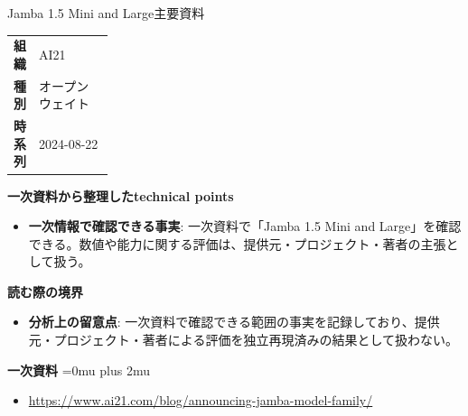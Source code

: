 \begin{technicalnote}{Jamba 1.5 Mini and Large}{主要資料}
\begingroup
\begin{tabularx}{\linewidth}{@{}>{\bfseries}p{0.22\linewidth}X@{}}
組織 & AI21 \\
種別 & オープンウェイト \\
時系列 & 2024-08-22 \\
\end{tabularx}
\smallskip
{\bfseries 一次資料から整理したtechnical points}
\begin{itemize}[leftmargin=1.5em,itemsep=0.35em]
\item \textbf{一次情報で確認できる事実}: 一次資料で「Jamba 1.5 Mini and Large」を確認できる。数値や能力に関する評価は、提供元・プロジェクト・著者の主張として扱う。
\end{itemize}
\begin{minipage}{\linewidth}
{\bfseries 読む際の境界}
\begin{itemize}[leftmargin=1.5em,itemsep=0.35em]
\item \textbf{分析上の留意点}: 一次資料で確認できる範囲の事実を記録しており、提供元・プロジェクト・著者による評価を独立再現済みの結果として扱わない。
\end{itemize}
\begin{samepage}
{\bfseries 一次資料}
\begingroup\sloppy
\Urlmuskip=0mu plus 2mu\relax
\begin{itemize}[leftmargin=1.5em,itemsep=0.25em]
\item {\scriptsize\url{https://www.ai21.com/blog/announcing-jamba-model-family/}}
\end{itemize}
\endgroup
\end{samepage}
\end{minipage}
\endgroup
\end{technicalnote}
\medskip

